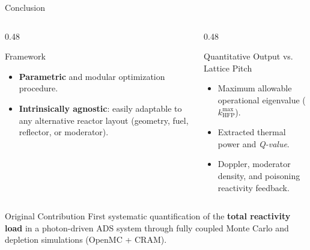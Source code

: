 \documentclass[aspectratio=169]{beamer}
\begin{document}
\begin{frame}{Conclusion}
    \begin{columns}[T]
        \begin{column}{0.48\textwidth}
            \begin{block}{Framework}
                \begin{itemize}
                    \item \textbf{Parametric} and modular optimization procedure.
                    \item \textbf{Intrinsically agnostic}: easily adaptable to any alternative reactor layout (geometry, fuel, reflector, or moderator).
                \end{itemize}
            \end{block}
        \end{column}
        
        \begin{column}{0.48\textwidth}
            \begin{alertblock}{Quantitative Output vs. Lattice Pitch}
                \begin{itemize}
                    \item Maximum allowable operational eigenvalue ($k_{\text{HFP}}^{\text{max}}$).
                    \item Extracted thermal power and \textit{Q-value}.
                    \item Doppler, moderator density, and poisoning reactivity feedback.
                \end{itemize}
            \end{alertblock}
        \end{column}
    \end{columns}
    
    \vspace{0.5cm}
    
    \begin{block}{Original Contribution}
        First systematic quantification of the \textbf{total reactivity load} in a photon-driven ADS system through fully coupled Monte Carlo and depletion simulations (OpenMC + CRAM).
    \end{block}
\end{frame}
\end{document}
